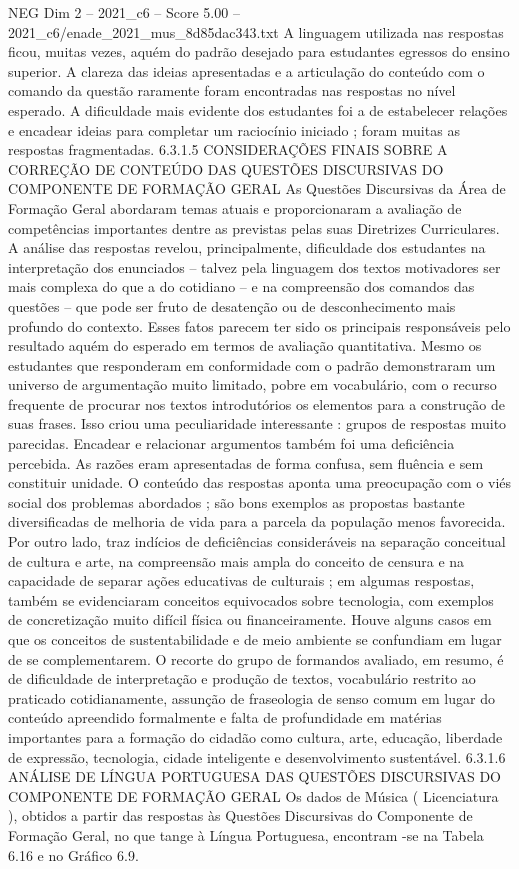 \begin{textsample}{NEG Dim 2 – 2021\_c6 – Score 5.00 – 2021\_c6/enade\_2021\_mus\_8d85dac343.txt}
A linguagem utilizada nas respostas ficou, muitas vezes, aquém do padrão desejado para estudantes egressos do ensino superior.
A clareza das ideias apresentadas e a articulação do conteúdo com o comando da questão raramente foram encontradas nas respostas no nível esperado.
A dificuldade mais evidente dos estudantes foi a de estabelecer relações e encadear ideias para completar um raciocínio iniciado ; foram muitas as respostas fragmentadas. 6.3.1.5 CONSIDERAÇÕES FINAIS SOBRE A CORREÇÃO DE CONTEÚDO DAS QUESTÕES DISCURSIVAS DO COMPONENTE DE FORMAÇÃO GERAL As Questões Discursivas da Área de Formação Geral abordaram temas atuais e proporcionaram a avaliação de competências importantes dentre as previstas pelas suas Diretrizes Curriculares.
A análise das respostas revelou, principalmente, dificuldade dos estudantes na interpretação dos enunciados – talvez pela linguagem dos textos motivadores ser mais complexa do que a do cotidiano – e na compreensão dos comandos das questões – que pode ser fruto de desatenção ou de desconhecimento mais profundo do contexto.
Esses fatos parecem ter sido os principais responsáveis pelo resultado aquém do esperado em termos de avaliação quantitativa.
Mesmo os estudantes que responderam em conformidade com o padrão demonstraram um universo de argumentação muito limitado, pobre em vocabulário, com o recurso frequente de procurar nos textos introdutórios os elementos para a construção de suas frases.
Isso criou uma peculiaridade interessante : grupos de respostas muito parecidas.
Encadear e relacionar argumentos também foi uma deficiência percebida.
As razões eram apresentadas de forma confusa, sem fluência e sem constituir unidade.
O conteúdo das respostas aponta uma preocupação com o viés social dos problemas abordados ; são bons exemplos as propostas bastante diversificadas de melhoria de vida para a parcela da população menos favorecida.
Por outro lado, traz indícios de deficiências consideráveis na separação conceitual de cultura e arte, na compreensão mais ampla do conceito de censura e na capacidade de separar ações educativas de culturais ; em algumas respostas, também se evidenciaram conceitos equivocados sobre tecnologia, com exemplos de concretização muito difícil física ou financeiramente.
Houve alguns casos em que os conceitos de sustentabilidade e de meio ambiente se confundiam em lugar de se complementarem.
O recorte do grupo de formandos avaliado, em resumo, é de dificuldade de interpretação e produção de textos, vocabulário restrito ao praticado cotidianamente, assunção de fraseologia de senso comum em lugar do conteúdo apreendido formalmente e falta de profundidade em matérias importantes para a formação do cidadão como cultura, arte, educação, liberdade de expressão, tecnologia, cidade inteligente e desenvolvimento sustentável. 6.3.1.6 ANÁLISE DE LÍNGUA PORTUGUESA DAS QUESTÕES DISCURSIVAS DO COMPONENTE DE FORMAÇÃO GERAL Os dados de Música ( Licenciatura ), obtidos a partir das respostas às Questões Discursivas do Componente de Formação Geral, no que tange à Língua Portuguesa, encontram -se na Tabela 6.16 e no Gráfico 6.9.

\end{textsample}

